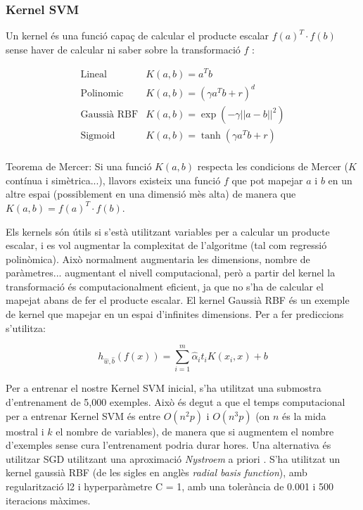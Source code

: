 \documentclass[12pt, spanish]{article}
\begin{document}
\subsubsection{Kernel SVM}

Un kernel és una funció capaç de calcular el producte escalar $f(a)^T \cdot f(b)$ sense haver de calcular ni saber sobre la transformació $f$ \cite[Cap. 5]{geron2019hands}:

\begin{equation} 
\begin{split}
\text{Lineal}          & K(a,b) = a^Tb \\
\text{Polinomic }    & K(a,b) = (\gamma a^T b + r)^d \\
\text{Gaussià RBF}& K(a,b) = \exp(-\gamma ||a - b||^2) \\
\text{Sigmoid}       & K(a,b) =  \tanh(\gamma a^Tb + r)\\
\end{split}
\end{equation}

Teorema de Mercer: Si una funció $K(a,b)$ respecta les condicions de Mercer ($K$ contínua i simètrica...), llavors existeix una funció $f$ que pot mapejar $a$ i $b$ en un altre espai (possiblement en una dimensió mès alta) de manera que $K(a,b) = f(a)^T \cdot f(b)$. 


Els kernels són útils si s'està utilitzant variables per a calcular un producte escalar, i es vol augmentar la complexitat de l'algoritme (tal com regressió polinòmica). Això normalment augmentaria les dimensions, nombre de paràmetres... augmentant el nivell computacional, però a partir del kernel la transformació és computacionalment eficient, ja que no s'ha de calcular el mapejat abans de fer el producte escalar. El kernel Gaussià RBF és un exemple de kernel que  mapejar en un espai d'infinites dimensions. Per a fer prediccions s'utilitza:

$$
h_{\hat{w}, \hat{b}}(f(x)) = \sum^m_{i = 1} \hat{\alpha}_i t_i K(x_i, x) + b
$$

Per a entrenar el nostre Kernel SVM inicial, s'ha utilitzat una submostra d'entrenament de 5,000 exemples. Això és degut a que el temps computacional per a entrenar Kernel SVM és entre $O(n^2 p)$  i $O(n^3 p)$ (on $n$ és la mida mostral i $k$ el nombre de variables), de manera que si augmentem el nombre d'exemples sense cura l'entrenament podria durar hores. Una alternativa és utilitzar SGD utilitzant una aproximació \textit{Nystroem} a priori \cite{sklearn}. S'ha utilitzat un kernel gaussià RBF (de les sigles en anglès \textit{radial basis function}), amb regularització l2 i hyperparàmetre C = 1, amb una tolerància de 0.001 i 500 iteracions màximes. 
\end{document}
